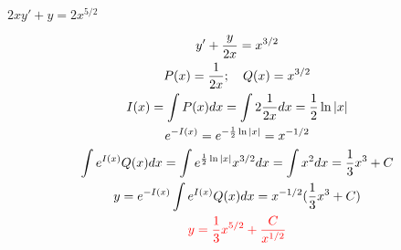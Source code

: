 \item [4.] $2xy' + y = 2x^{5/2}$

\textcolor{blue}{
    \begin{gather*}
        y'+\frac{y}{2x}=x^{3/2}\\
        P(x)=\frac{1}{2x}; \quad Q(x)=x^{3/2}\\
        I(x)=\int P(x)dx = \int 2\frac{1}{2x}dx=\frac{1}{2}\ln|x|\\
        e^{-I(x)}=e^{-\frac{1}{2}\ln|x|}=x^{-1/2}\\
        \int e^{I(x)}Q(x)dx=\int e^{\frac{1}{2}\ln|x|}x^{3/2}dx=\int x^2dx=\frac{1}{3}x^3+C\\
        y=e^{-I(x)}\int e^{I(x)}Q(x)dx=x^{-1/2}(\frac{1}{3}x^3+C)\\
        \textcolor{red}{
        y=\frac{1}{3}x^{5/2}+\frac{C}{x^{1/2}}
        }
    \end{gather*}
}